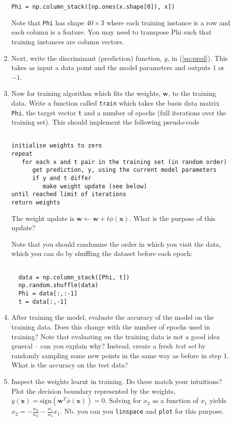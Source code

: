 \documentclass{article}
\begin{document}
\begin{enumerate}
\begin{enumerate}
\begin{verbatim}
Phi = np.column_stack([np.ones(x.shape[0]), x])
\end{verbatim}
Note that \lstinline+Phi+ has shape $40 \times 3$ where each training instance is a row and each column is a feature. You may need to transpose Phi such that training instances are column vectors.

\item Next, write the discriminant (prediction) function, $y$, in (\ref{eq:pred}). This takes as input a data point and the model parameters and outputs $1$ or $-1$. 

\item Now for training algorithm which fits the weights, $\mathbf{w}$, to the training data. Write a function called \lstinline+train+ which takes the basis data matrix \lstinline+Phi+, the target vector \lstinline+t+ and a number of epochs (full iterations over the training set). This should implement the following pseudo-code
\begin{verbatim}

initialise weights to zero 
repeat
   for each x and t pair in the training set (in random order)  
      get prediction, y, using the current model parameters 
      if y and t differ
         make weight update (see below) 
until reached limit of iterations
return weights
\end{verbatim}
The weight update is $\mathbf{w} \leftarrow \mathbf{w} + t \phi(\mathbf{x})$.
What is the purpose of this update? 

Note that you should randomise the order in which you visit the data, which you can do by shuffling the dataset before each epoch:
\begin{verbatim}

  data = np.column_stack([Phi, t])
  np.random.shuffle(data)
  Phi = data[:,:-1]
  t = data[:,-1]
\end{verbatim}

\item After training the model, evaluate the accuracy of the model on the training data. Does this change with the number of epochs used in training? Note that evaluating on the training data is not a good idea general -- can you explain why? Instead, create a fresh \emph{test set} by randomly sampling some new points in the same way as before in step 1. What is the accuracy on the test data? 

\item Inspect the weights learnt in training. Do these match your intuitions? Plot the decision boundary represented by the weights, $y(\mathbf{x}) = \mbox{sign}(\mathbf{w}^T \phi(\mathbf{x})) = 0$. Solving for $x_2$ as a function of $x_1$ yields $x_2 = -\frac{w_0}{w_2} - \frac{w_1}{w_2} x_1$. Nb. you can you \lstinline+linspace+ and \lstinline+plot+ for this purpose. 


\end{enumerate}
\end{enumerate}
\end{document}
